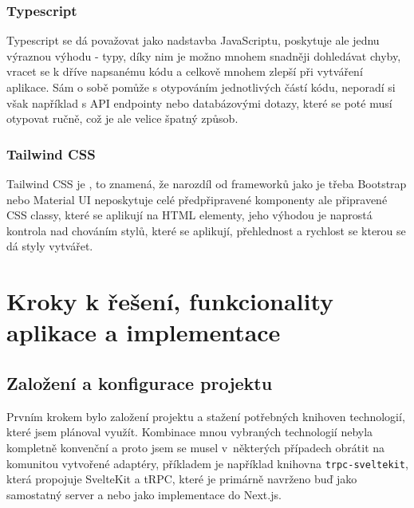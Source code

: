 \documentclass[12pt, a4paper,
openright
]{report}
\begin{document}
\subsection{Typescript}
Typescript se dá považovat jako nadstavba JavaScriptu, poskytuje ale jednu výraznou výhodu - typy, díky nim je možno mnohem snadněji dohledávat chyby, vracet se k dříve napsanému kódu a celkově mnohem zlepší  při vytváření aplikace. Sám o sobě pomůže s otypováním jednotlivých částí kódu, neporadí si však například s API endpointy nebo databázovými dotazy, které se poté musí otypovat ručně, což je ale velice špatný způsob.

\subsection{Tailwind CSS}
Tailwind CSS je , to znamená, že narozdíl od frameworků jako je třeba Bootstrap nebo Material UI neposkytuje celé předpřipravené komponenty ale připravené CSS classy, které se aplikují na HTML elementy, jeho výhodou je naprostá kontrola nad chováním stylů, které se aplikují, přehlednost a rychlost se kterou se dá styly vytvářet.

\chapter{Kroky k řešení, funkcionality aplikace a implementace}
\section{Založení a konfigurace projektu}
Prvním krokem bylo založení projektu a stažení potřebných knihoven technologií, které jsem plánoval využít. Kombinace mnou vybraných technologií nebyla kompletně konvenční a proto jsem se musel v~některých případech obrátit na komunitou vytvořené adaptéry, příkladem je například knihovna \texttt{trpc-sveltekit}, která propojuje SvelteKit a tRPC, které je primárně navrženo buď jako samostatný server a nebo jako implementace do Next.js.

\clearpage
\end{document}
